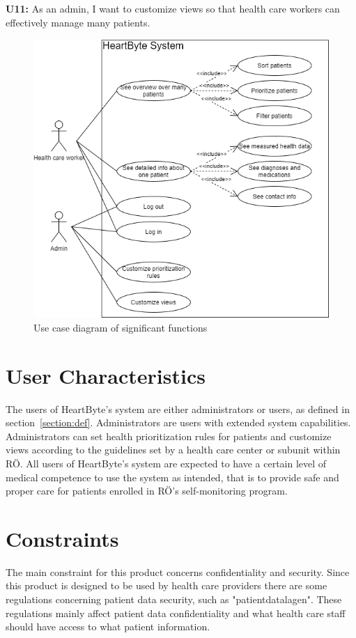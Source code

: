 \documentclass{scrreprt}
\begin{document}
\newline
\textbf{U11:} As an admin, I want to customize views so that health care workers can effectively manage many patients. 
\begin{figure}[htp]
    \centering
    \includegraphics[width=15cm]{useCase.png}
    \caption{Use case diagram of significant functions}
    \label{fig: useCaseDiag}
\end{figure}

\section{User Characteristics}
The users of HeartByte’s system are either administrators or users, as defined in section~\ref{section:def}. Administrators are users with extended system capabilities. Administrators can set health prioritization rules for patients and customize views according to the guidelines set by a health care center or subunit within RÖ. All users of HeartByte’s system are expected to have a certain level of medical competence to use the system as intended, that is to provide safe and proper care for patients enrolled in RÖ’s self-monitoring program.


\section{Constraints}
The main constraint for this product concerns confidentiality and security. Since this product is designed to be used by health care providers there are some regulations concerning patient data security, such as "patientdatalagen". These regulations mainly affect patient data confidentiality and what health care staff should have access to what patient information.
\end{document}
